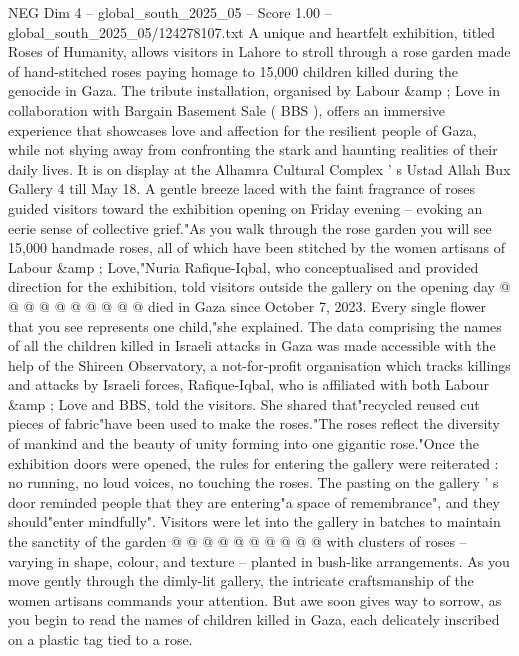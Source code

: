 \begin{textsample}{NEG Dim 4 – global\_south\_2025\_05 – Score 1.00 – global\_south\_2025\_05/124278107.txt}  \label{ex:f4_neg_364}
A unique and heartfelt exhibition, titled Roses of Humanity, allows visitors in Lahore to stroll through a rose garden made of hand-stitched roses paying homage to 15,000 children killed during the genocide in Gaza.
The tribute installation, organised by Labour \&amp ; Love in collaboration with Bargain Basement Sale ( BBS ), offers an immersive experience that showcases love and affection for the resilient people of Gaza, while not shying away from confronting the stark and haunting realities of their daily lives.
It is on display at the Alhamra Cultural Complex ' s Ustad Allah Bux Gallery 4 till May 18.
A gentle breeze laced with the faint fragrance of roses guided visitors toward the exhibition opening on Friday evening -- evoking an eerie sense of collective grief."As you walk through the rose garden you will see 15,000 handmade roses, all of which have been stitched by the women artisans of Labour \&amp ; Love,"Nuria Rafique-Iqbal, who conceptualised and provided direction for the exhibition, told visitors outside the gallery on the opening day @ @ @ @ @ @ @ @ @ @ died in Gaza since October 7, 2023.
Every single flower that you see represents one child,"she explained.
The data comprising the names of all the children killed in Israeli attacks in Gaza was made accessible with the help of the Shireen Observatory, a not-for-profit organisation which tracks killings and attacks by Israeli forces, Rafique-Iqbal, who is affiliated with both Labour \&amp ; Love and BBS, told the visitors.
She shared that"recycled reused cut pieces of fabric"have been used to make the roses."The roses reflect the diversity of mankind and the beauty of unity forming into one gigantic rose."Once the exhibition doors were opened, the rules for entering the gallery were reiterated : no running, no loud voices, no touching the roses.
The pasting on the gallery ' s door reminded people that they are entering"a space of remembrance", and they should"enter mindfully".
Visitors were let into the gallery in batches to maintain the sanctity of the garden @ @ @ @ @ @ @ @ @ @ with clusters of roses -- varying in shape, colour, and texture -- planted in bush-like arrangements.
As you move gently through the dimly-lit gallery, the intricate craftsmanship of the women artisans commands your attention.
But awe soon gives way to sorrow, as you begin to read the names of children killed in Gaza, each delicately inscribed on a plastic tag tied to a rose.

\end{textsample}
